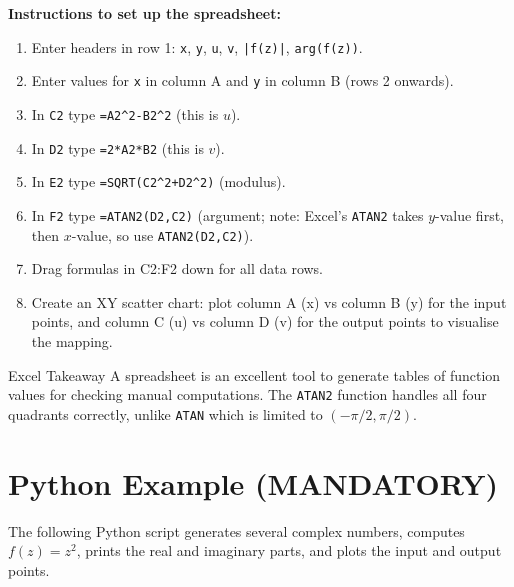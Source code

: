 \documentclass[12pt,a4paper]{article}
\begin{document}
\noindent\textbf{Instructions to set up the spreadsheet:}
\begin{enumerate}[noitemsep]
  \item Enter headers in row 1: \texttt{x}, \texttt{y}, \texttt{u}, \texttt{v},
        \texttt{|f(z)|}, \texttt{arg(f(z))}.
  \item Enter values for \texttt{x} in column A and \texttt{y} in column B
        (rows 2 onwards).
  \item In \texttt{C2} type \texttt{=A2\^{}2-B2\^{}2} (this is \(u\)).
  \item In \texttt{D2} type \texttt{=2*A2*B2} (this is \(v\)).
  \item In \texttt{E2} type \texttt{=SQRT(C2\^{}2+D2\^{}2)} (modulus).
  \item In \texttt{F2} type \texttt{=ATAN2(D2,C2)}
        (argument; note: Excel's \texttt{ATAN2} takes
        \(y\)-value first, then \(x\)-value, so use
        \texttt{ATAN2(D2,C2)}).
  \item Drag formulas in C2:F2 down for all data rows.
  \item Create an XY scatter chart: plot column A (x) vs column B (y) for
        the input points, and column C (u) vs column D (v) for the output
        points to visualise the mapping.
\end{enumerate}

\begin{learnbox}{Excel Takeaway}
A spreadsheet is an excellent tool to generate tables of function values for
checking manual computations.  The \texttt{ATAN2} function handles all four
quadrants correctly, unlike \texttt{ATAN} which is limited to \((-\pi/2,\pi/2)\).
\end{learnbox}

\section{Python Example (MANDATORY)}

The following Python script generates several complex numbers, computes
\(f(z)=z^2\), prints the real and imaginary parts, and plots the input and
output points.
\end{document}
